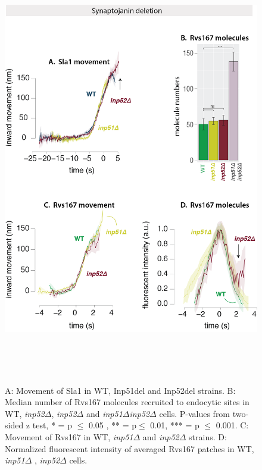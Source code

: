 	\begin{figure}[H]
	\centering
	\includegraphics[width=19cm,height=19cm,keepaspectratio]{figures/results_final/inp_movement3}
	\caption[Synaptojanin deletion]
	{A: Movement of Sla1 in WT, Inp51del and Inp52del strains. 
		B: Median number of Rvs167 molecules recruited to endocytic sites in WT, \textit{inp52$\Delta$}, \textit{inp52$\Delta$ } and \textit{inp51$\Delta$inp52$\Delta$ } cells. P-values from two-sided z test,  * = p $\leq$ 0.05 , ** = p$\leq$ 0.01, *** = p $\leq$ 0.001.  
		C: Movement of Rvs167 in WT, \textit{inp51$\Delta$ } and \textit{inp52$\Delta$ } strains. 
		D: Normalized fluorescent intensity of averaged Rvs167 patches in WT, \textit{inp51$\Delta$ }, \textit{inp52$\Delta$ } cells.
		\label{fig_inpmov}}
\end{figure}


